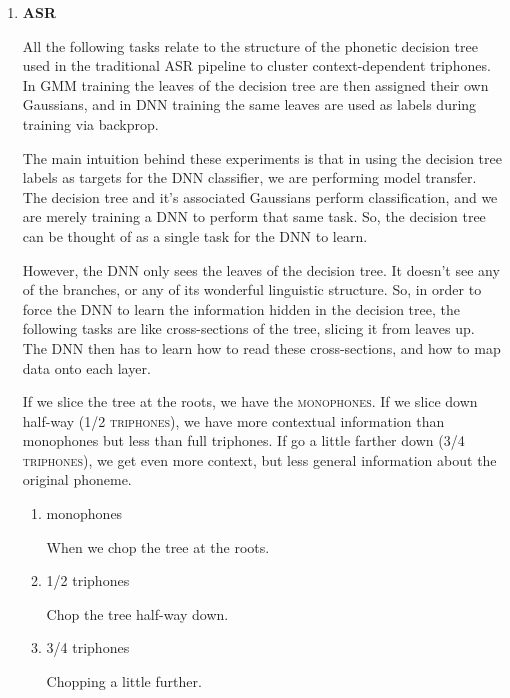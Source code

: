 \documentclass[10pt,a4paper]{article}
\begin{document}
\begin{enumerate}
\item \textbf{ASR}

  All the following tasks relate to the structure of the phonetic decision tree used in the traditional ASR pipeline to cluster context-dependent triphones. In GMM training the leaves of the decision tree are then assigned their own Gaussians, and in DNN training the same leaves are used as labels during training via backprop.

  The main intuition behind these experiments is that in using the decision tree labels as targets for the DNN classifier, we are performing model transfer. The decision tree and it's associated Gaussians perform classification, and we are merely training a DNN to perform that same task. So, the decision tree can be thought of as a single task for the DNN to learn.

  However, the DNN only sees the leaves of the decision tree. It doesn't see any of the branches, or any of its wonderful linguistic structure. So, in order to force the DNN to learn the information hidden in the decision tree, the following tasks are like cross-sections of the tree, slicing it from leaves up. The DNN then has to learn how to read these cross-sections, and how to map data onto each layer.

  If we slice the tree at the roots, we have the \textsc{monophones}. If we slice down half-way (\textsc{1/2 triphones}), we have more contextual information than monophones but less than full triphones. If go a little farther down (\textsc{3/4 triphones}), we get even more context, but less general information about the original phoneme.
  
  \begin{enumerate}
  \item monophones

    When we chop the tree at the roots.
    
  \item 1/2 triphones

    Chop the tree half-way down.
    
  \item 3/4 triphones

    Chopping a little further.
    
  \end{enumerate}


  


\end{enumerate}
\end{document}
